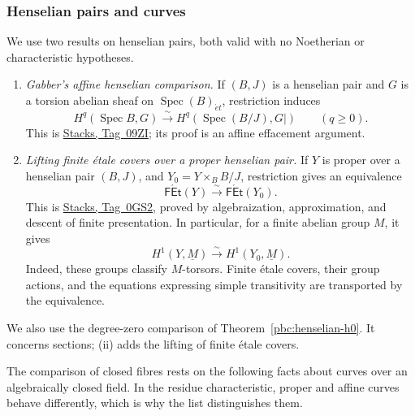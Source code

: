 \documentclass[11pt,a4paper]{article}
\numberwithin{equation}{section}
\theoremstyle{definition}
\theoremstyle{remark}
\newcommand{\et}{\acute{e}t}
\newcommand{\stacks}[1]{\href{https://stacks.math.columbia.edu/tag/#1}{\textnormal{Stacks, Tag~#1}}}
\begin{document}
\subsubsection{Henselian pairs and curves}

We use two results on henselian pairs, both valid with no Noetherian
or characteristic hypotheses.
\begin{enumerate}[label=(\roman*)]
\item \emph{Gabber's affine henselian comparison.}
If $(B,J)$ is a henselian pair and $G$ is a torsion abelian sheaf on
$\operatorname{Spec}(B)_{\et}$, restriction induces
\[
 H^q(\operatorname{Spec}B,G)
 \xrightarrow{\sim}
 H^q(\operatorname{Spec}(B/J),G|)
 \qquad(q\geq0).
\]
This is \stacks{09ZI}; its proof is an affine effacement argument.
\item \emph{Lifting finite \'etale covers over a proper henselian pair.}
If $Y$ is proper over a henselian pair $(B,J)$, and
$Y_0=Y\times_B B/J$, restriction gives an equivalence
\[
 \mathsf{F\acute Et}(Y)\xrightarrow{\sim}
 \mathsf{F\acute Et}(Y_0).
\]
This is \stacks{0GS2}, proved by algebraization, approximation, and
descent of finite presentation.  In particular, for a finite abelian
group $M$, it gives
\begin{equation}
 H^1(Y,\underline M)\xrightarrow{\sim}H^1(Y_0,\underline M).
 \label{pbc:finite-torsors}
\end{equation}
Indeed, these groups classify $M$-torsors.  Finite \'etale covers, their
group actions, and the equations expressing simple transitivity are
transported by the equivalence.
\end{enumerate}
We also use the degree-zero comparison of
Theorem~\ref{pbc:henselian-h0}. It concerns sections; (ii) adds the
lifting of finite \'etale covers.

The comparison of closed fibres rests on the following facts about
curves over an algebraically closed field. In the residue
characteristic, proper and affine curves behave differently, which is
why the list distinguishes them.
\end{document}
